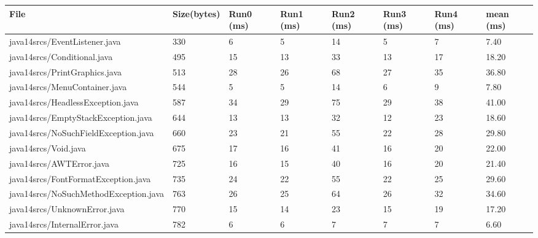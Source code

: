 \begin{tabular}{|l|l|l|l|l|l|l|l|}
\hline
File                                               & Size(bytes) & Run0 (ms) & Run1 (ms) & Run2 (ms) & Run3 (ms) & Run4 (ms) & mean (ms) \\
\hline
java14srcs/EventListener.java                      & 330         & 6         & 5         & 14        & 5         & 7         & 7.40      \\
\hline
java14srcs/Conditional.java                        & 495         & 15        & 13        & 33        & 13        & 17        & 18.20     \\
\hline
java14srcs/PrintGraphics.java                      & 513         & 28        & 26        & 68        & 27        & 35        & 36.80     \\
\hline
java14srcs/MenuContainer.java                      & 544         & 5         & 5         & 14        & 6         & 9         & 7.80      \\
\hline
java14srcs/HeadlessException.java                  & 587         & 34        & 29        & 75        & 29        & 38        & 41.00     \\
\hline
java14srcs/EmptyStackException.java                & 644         & 13        & 13        & 32        & 12        & 23        & 18.60     \\
\hline
java14srcs/NoSuchFieldException.java               & 660         & 23        & 21        & 55        & 22        & 28        & 29.80     \\
\hline
java14srcs/Void.java                               & 675         & 17        & 16        & 41        & 16        & 20        & 22.00     \\
\hline
java14srcs/AWTError.java                           & 725         & 16        & 15        & 40        & 16        & 20        & 21.40     \\
\hline
java14srcs/FontFormatException.java                & 735         & 24        & 22        & 55        & 22        & 25        & 29.60     \\
\hline
java14srcs/NoSuchMethodException.java              & 763         & 26        & 25        & 64        & 26        & 32        & 34.60     \\
\hline
java14srcs/UnknownError.java                       & 770         & 15        & 14        & 23        & 15        & 19        & 17.20     \\
\hline
java14srcs/InternalError.java                      & 782         & 6         & 6         & 7         & 7         & 7         & 6.60      \\

\end{tabular}
